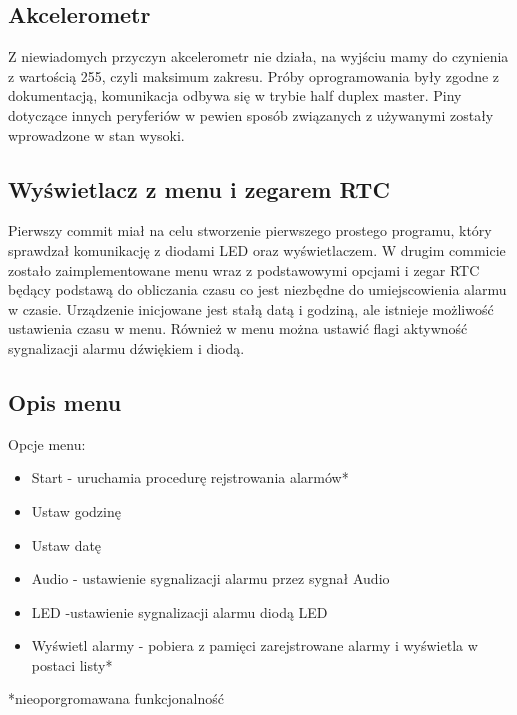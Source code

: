 \documentclass[10pt, a4paper]{article}
\begin{document}
\subsection{Akcelerometr}
Z niewiadomych przyczyn akcelerometr nie działa, na wyjściu mamy do czynienia z wartością 255, czyli maksimum zakresu. Próby oprogramowania były zgodne z dokumentacją, komunikacja odbywa się w trybie half duplex master. Piny dotyczące innych peryferiów w pewien sposób związanych z używanymi zostały wprowadzone w stan wysoki.
\subsection{Wyświetlacz z menu i zegarem RTC}
Pierwszy commit miał na celu stworzenie pierwszego prostego programu, który sprawdzał komunikację z diodami LED oraz wyświetlaczem.
W drugim commicie zostało zaimplementowane menu wraz z podstawowymi opcjami i zegar RTC będący podstawą do obliczania czasu co jest niezbędne do umiejscowienia alarmu w czasie. Urządzenie inicjowane jest stałą datą i godziną, ale istnieje możliwość ustawienia czasu w menu. Również w menu można ustawić flagi aktywność sygnalizacji alarmu dźwiękiem i diodą.
\subsection{Opis menu}

Opcje menu:
\begin {itemize}
\item Start - uruchamia procedurę rejstrowania alarmów*
\item Ustaw godzinę
\item Ustaw datę
\item Audio - ustawienie sygnalizacji alarmu przez sygnał Audio
\item LED -ustawienie sygnalizacji alarmu diodą LED
\item Wyświetl alarmy - pobiera z pamięci zarejstrowane alarmy i wyświetla w postaci listy*

\end {itemize}

*nieoporgromawana funkcjonalność
\end{document}

